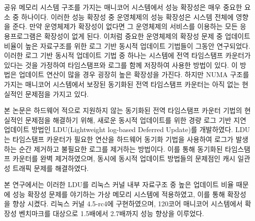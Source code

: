 \documentclass[doctor,korean,final]{kmu}
\begin{document}
\normalsize{
\hfill \break
\begin{center}
\\
\end{center}

\begin{center}
\\
\end{center}
\hfill \break

공유 메모리 시스템 구조를 가지는 매니코어 시스템에서 성능 확장성은 매우 중요한 요소 중 하나이다.   
이러한 성능 확장성 중 운영체제의 성능 확장성은 시스템 전체에 영향을 준다. 
만약 운영체제가 확장성이 없다면 그 운영체제의 서비스를 이용하는 모든 응용프로그램은 확장성이 없게 된다.
이처럼 중요한 운영체제의 확장성 문제 중 업데이트 비율이 높은 자료구조를 위한 
로그 기반 동시적 업데이트 기법들이 그동안 연구되었다. 
이러한 로그 기반 동시적 업데이트 기법 중 하나는 
시스템에 전역 타임스탬프 카운터가 있다는 것을 가정하여 타임스탬프와 로그를 함께 저장하여 
사용한 방법이 있다. 
이 방법은 업데이트 연산이 많을 경우 굉장히 높은 확장성을 가진다. 
하지만 NUMA 구조를 가지는 매니코어 시스템에서 보장된 동기화된 
전역 타임스탬프 카운터는 아직 없는 현실적인 문제점을 가지고 있다.

본 논문은 하드웨어 적으로 지원하지 않는 동기화된 전역 타임스탬프 카운터 기법의 현실적인 문제점을 
해결하기 위해, 새로운 동시적 업데이트를 위한 경량 로그 기반 지연 업데이트 방법인 
LDU(Lightweight log-based Deferred Update)를 개발하였다.
LDU는 타임스탬프 카운터가 필요한 연산을 하드웨어 동기화 기법을 사용하여 
로그가 발생하는 순간 제거하고 불필요한 로그를 제거하는 방법이다. 
이를 통해 동기화된 타임스탬프 카운터를 완벽 제거하였으며, 동시에 동시적 업데이트 방법들의 문제점인
캐시 일관성 트래픽 문제를 해결하였다.

본 연구에서는 이러한 LDU를 리눅스 커널 내부 자료구조 중 높은 업데이트 비율 때문에 성능 확장성 
문제를 야기하는 가상 메모리 시스템에 적용하였고, 이를 통해 확장성을 향상 시켰다.
리눅스 커널 4.5-rc4에 구현하였으며, 120코어 매니코어 시스템에서 확장성 벤치마크를 대상으로 
1.5배에서 2.7배까지 성능 향상을 이루었다. 

}
\end{document}
